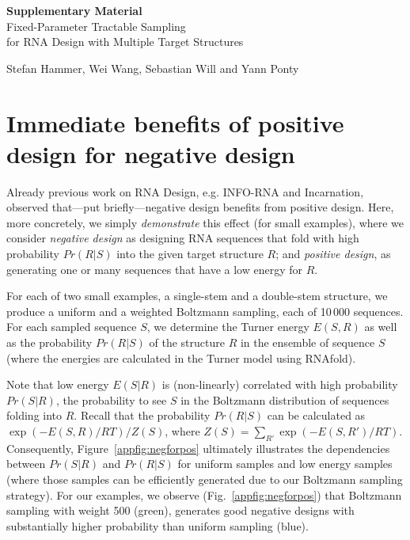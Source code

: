 \documentclass[10pt]{article}
\newcommand{\Def}[1]{\emph{#1}}
\begin{document}
\onecolumn

\appendix
{\centering \Large \textbf{Supplementary Material}\\[1em] Fixed-Parameter Tractable Sampling\\ for RNA Design with Multiple Target Structures\\%
}

\medskip
\begin{center}
\large Stefan Hammer, Wei Wang, Sebastian Will and Yann Ponty
\end{center}

\section{Immediate benefits of positive design for negative design}
\label{appsec:immediate-benefits-for-negative-design}
Already previous work on RNA Design, e.g. INFO-RNA and Incarnation, observed
that---put briefly---negative design benefits from positive design. Here, more
concretely, we simply \emph{demonstrate} this effect (for small examples), where
we consider \Def{negative design} as  
designing RNA sequences that fold with high probability $Pr(R|S)$ into the
given target structure $R$; and \Def{positive design}, as generating one or
many sequences that have a low energy for $R$.

For each of two small examples, a single-stem and a double-stem structure, we produce a uniform and a weighted Boltzmann
sampling, each of 10\,000 sequences. For each sampled sequence $S$, we determine
the Turner energy $E(S,R)$ as well as the
probability $Pr(R|S)$ of the structure $R$ in the ensemble of sequence $S$ 
(where the energies are calculated in the Turner model using RNAfold). 

Note that low energy $E(S|R)$ is (non-linearly) correlated with high
probability $Pr(S|R)$, the probability to see $S$ in the Boltzmann distribution
of sequences folding into $R$. Recall that the probability $Pr(R|S)$ can be
calculated as $\exp(-E(S,R)/RT)/Z(S)$,
where $Z(S)=\sum_{R'} \exp(-E(S,R')/RT)$.
%
Consequently, Figure~\ref{appfig:negforpos} ultimately illustrates the dependencies
between $Pr(S|R)$ and $Pr(R|S)$ for uniform samples and low energy samples
(where those samples can be efficiently generated due to our Boltzmann sampling
strategy). For our examples, we observe (Fig.~\ref{appfig:negforpos}) that Boltzmann sampling with weight 500 (green), generates good negative designs 
with substantially higher probability than uniform sampling (blue).
\end{document}
